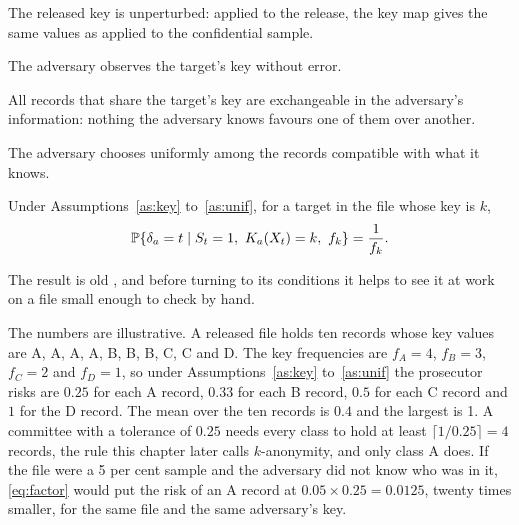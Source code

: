\begin{assumption}\label{as:key}
The released key is unperturbed: applied to the release, the key map gives the
same values as applied to the confidential sample.
\end{assumption}
\begin{assumption}\label{as:obs}
The adversary observes the target's key without error.
\end{assumption}
\begin{assumption}\label{as:exch}
All records that share the target's key are exchangeable in the adversary's
information: nothing the adversary knows favours one of them over another.
\end{assumption}
\begin{assumption}\label{as:unif}
The adversary chooses uniformly among the records compatible with what it knows.
\end{assumption}

\begin{proposition}\label{prop:recip}
Under Assumptions~\ref{as:key} to~\ref{as:unif}, for a target in the file whose key
is $k$,
\begin{equation}\label{eq:recip}
\mathbb{P}\{\delta_a = t \mid S_t = 1,\ K_a(X_t) = k,\ f_k\} = \frac{1}{f_k}.
\end{equation}
\end{proposition}

The result is old \citep{duncan1989,skinner2002}, and before turning to its conditions it helps to see it at work on a file small enough to check by hand.

\begin{example}\label{c2:ex-small}
The numbers are illustrative. A released file holds ten records whose key values are A, A, A, A, B, B, B, C, C and D. The key frequencies are $f_A=4$, $f_B=3$, $f_C=2$ and $f_D=1$, so under Assumptions~\ref{as:key} to~\ref{as:unif} the prosecutor risks are $0.25$ for each A record, $0.33$ for each B record, $0.5$ for each C record and $1$ for the D record. The mean over the ten records is $0.4$ and the largest is 1. A committee with a tolerance of $0.25$ needs every class to hold at least $\lceil1/0.25\rceil=4$ records, the rule this chapter later calls $k$-anonymity, and only class A does. If the file were a 5 per cent sample and the adversary did not know who was in it, \eqref{eq:factor} would put the risk of an A record at $0.05\times0.25=0.0125$, twenty times smaller, for the same file and the same adversary's key.
\end{example}

